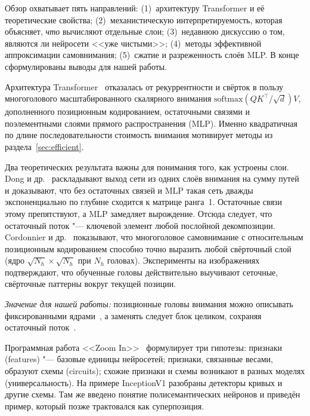 Обзор охватывает пять направлений: (1)~архитектуру Transformer и её
теоретические свойства; (2)~механистическую интерпретируемость, которая
объясняет, \emph{что} вычисляют отдельные слои; (3)~недавнюю дискуссию о
том, являются ли нейросети <<уже чистыми>>; (4)~методы эффективной
аппроксимации самовнимания; (5)~сжатие и разреженность слоёв MLP. В конце
сформулированы выводы для нашей работы.


Архитектура Transformer~\cite{vaswani2017attention} отказалась от
рекуррентности и свёрток в пользу многоголового масштабированного
скалярного внимания $\mathrm{softmax}(QK^\top/\sqrt{d})V$, дополненного
позиционным кодированием, остаточными связями и поэлементными
слоями прямого распространения (MLP). Именно квадратичная по длине
последовательности стоимость внимания мотивирует методы из
раздела~\ref{sec:efficient}.

Два теоретических результата важны для понимания того, как устроены
слои. Dong и др.~\cite{dong2021attention} раскладывают выход сети из
одних слоёв внимания на сумму путей и доказывают, что без остаточных
связей и MLP такая сеть дважды экспоненциально по глубине сходится к
матрице ранга~1. Остаточные связи этому препятствуют, а MLP замедляет
вырождение. Отсюда следует, что остаточный поток "--- ключевой элемент
любой послойной декомпозиции. Cordonnier и
др.~\cite{cordonnier2020relationship} показывают, что многоголовое
самовнимание с относительным позиционным кодированием способно точно
выразить любой свёрточный слой (ядро $\sqrt{N_h}\times\sqrt{N_h}$ при
$N_h$ головах). Эксперименты на изображениях подтверждают, что
обученные головы действительно выучивают сеточные, свёрточные паттерны
вокруг текущей позиции.

\emph{Значение для нашей работы:} позиционные головы внимания можно
описывать фиксированными ядрами~\cite{cordonnier2020relationship}, а
заменять следует блок целиком, сохраняя остаточный
поток~\cite{dong2021attention}.


Программная работа <<Zoom In>>~\cite{olah2020zoom} формулирует три
гипотезы: признаки (features) "--- базовые единицы нейросетей;
признаки, связанные весами, образуют схемы (circuits); схожие признаки
и схемы возникают в разных моделях (универсальность). На примере
InceptionV1 разобраны детекторы кривых и другие схемы. Там же введено
понятие полисемантических нейронов и приведён пример, который позже
трактовался как суперпозиция.

